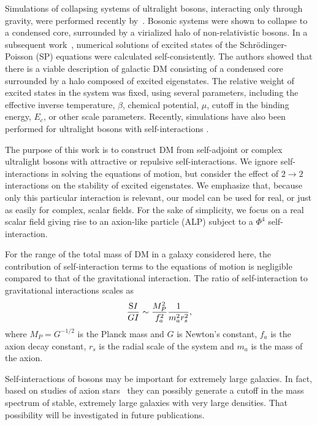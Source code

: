 \documentclass[aps,prl,twocolumn]{revtex4}
\begin{document}
Simulations of collapsing systems of ultralight bosons, interacting only through gravity, were performed recently by~\cite{Schive, Schive2, Schwabe, Veltmaat, Du,Levkov_Panin}.  Bosonic systems were shown to collapse to a condensed core, surrounded by a virialized halo of non-relativistic bosons. In a subsequent work~\cite{Lin}, numerical solutions of excited states of the Schr\"odinger-Poisson (SP) equations were calculated self-consistently.  The authors showed that there is a viable description of galactic DM consisting of a condensed core surrounded by a halo composed of excited eigenstates. The relative weight of excited states in the system was fixed, using several parameters, including the effective inverse temperature, $\beta$, chemical potential, $\mu$, cutoff in the binding energy, $E_c$, or other scale parameters. Recently, simulations have also been performed for ultralight bosons with self-interactions \cite{Glennon_Chanda}.  

The purpose of this work is to construct DM from self-adjoint or complex ultralight bosons with attractive or repulsive self-interactions.  We ignore self-interactions in solving the equations of motion, but consider the effect of $2 \rightarrow 2$ interactions on the stability of excited eigenstates.  We emphasize that,  because only this particular interaction is relevant, our model can be used for real, or just as easily for complex, scalar fields. For the sake of simplicity, we focus on a real scalar field giving rise to an axion-like particle (ALP) subject to a $\Phi^4$ self-interaction.  

For the  range of the total mass of DM in a galaxy considered here, the contribution of self-interaction terms to the equations of motion is negligible compared to that of the gravitational interaction. The ratio of self-interaction to gravitational interactions scales as
\begin{equation*}
\frac{\text SI}{GI}\sim \frac{M_P^2}{f_a^2}\frac{1}{m_a^2r_s^2},   
\end{equation*}
where $M_P = G^{-1/2}$ is the Planck mass and $G$ is Newton's constant, $f_a$ is the axion decay constant, $r_s$ is the radial scale of the system and $m_a$ is the mass of the axion.

Self-interactions of bosons may be important for extremely large galaxies. In fact, based on studies of axion stars~\cite{ChavanisMR,ChavanisMR2,Eby1} they can possibly generate a cutoff in the mass spectrum of stable, extremely large galaxies with very large densities. That possibility will be investigated in  future publications. 
\end{document}
